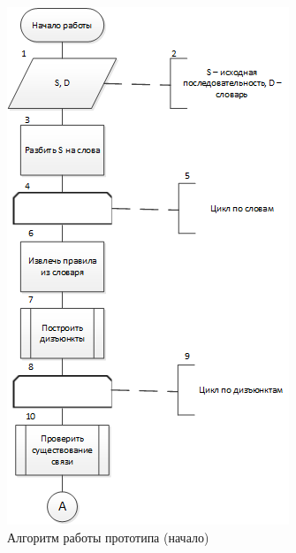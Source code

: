 \begin{figure}[H]
	\centering
		\includegraphics[scale=1.0]{images/initialalgorithmA.png}
	\caption{\small Алгоритм работы прототипа (начало)}
	\label{fig:initialalgorithmA}
\end{figure}

